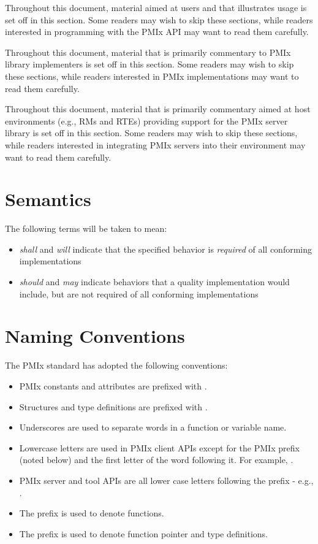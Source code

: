 \adviceuserstart
Throughout this document, material aimed at users and that illustrates usage is set off in this section.
Some readers may wish to skip these sections, while readers interested in programming with the \ac{PMIx} \ac{API} may want to read them carefully.
\adviceuserend

\adviceimplstart
Throughout this document, material that is primarily commentary to \ac{PMIx} library implementers is set off in this section.
Some readers may wish to skip these sections, while readers interested in \ac{PMIx} implementations may want to read them carefully.
\adviceimplend

\advicermstart
Throughout this document, material that is primarily commentary aimed at host environments (e.g., \acp{RM} and \acp{RTE}) providing support for the \ac{PMIx} server library is set off in this section.
Some readers may wish to skip these sections, while readers interested in integrating \ac{PMIx} servers into their environment may want to read them carefully.
\advicermend

\section{Semantics}

The following terms will be taken to mean:

\begin{itemize}
\item \emph{shall} and \emph{will} indicate that the specified behavior is \emph{required} of all conforming implementations
\item \emph{should} and \emph{may} indicate behaviors that a quality implementation would include, but are not required of all conforming implementations
\end{itemize}

\section{Naming Conventions}

The \ac{PMIx} standard has adopted the following conventions:

\begin{itemize}
\item \ac{PMIx} constants and attributes are prefixed with \textbf{}.
\item Structures and type definitions are prefixed with .
\item Underscores are used to separate words in a function or variable name.
\item Lowercase letters are used in \ac{PMIx} client \acp{API} except for the \ac{PMIx} prefix (noted below) and the first letter of the word following it.
For example, .
\item \ac{PMIx} server and tool \acp{API} are all lower case letters following the prefix - e.g., .
\item The  prefix is used to denote functions.
\item The  prefix is used to denote function pointer and type definitions.
\end{itemize}

